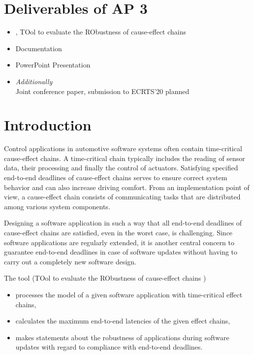 \section{Deliverables of AP 3}
\begin{itemize}
	\item \Tool, TOol to evaluate the RObustness of cause-effect chains
	\item Documentation
	\item PowerPoint Presentation
	\item \emph{Additionally}\\
	Joint conference paper, submission to ECRTS'20 planned
\end{itemize}

\newpage

\section{Introduction}
Control applications in automotive software systems often contain time-critical cause-effect chains.  
A time-critical chain typically includes the reading of sensor data, their processing and finally the control of actuators.  
Satisfying specified end-to-end deadlines of cause-effect  chains serves to ensure correct system behavior and can also increase driving comfort.
From an implementation point of view, a cause-effect chain consists of communicating tasks that are distributed among various system components. 
\smallskip

Designing a software application in such a way that all end-to-end deadlines of cause-effect chains are satisfied, even in the worst case, is challenging. 
Since software applications are regularly extended, it is another central concern to guarantee end-to-end deadlines in case of software updates without having to carry out a completely new software design. 


The tool \Tool (TOol to evaluate the RObustness of cause-effect chains )
\begin{itemize}
	\item processes the model of a given software application with time-critical effect chains,
	\item calculates the maximum end-to-end latencies of the given effect chains,
	\item makes statements about the robustness of applications during software updates with regard to compliance with end-to-end deadlines.
\end{itemize}
\bigskip

